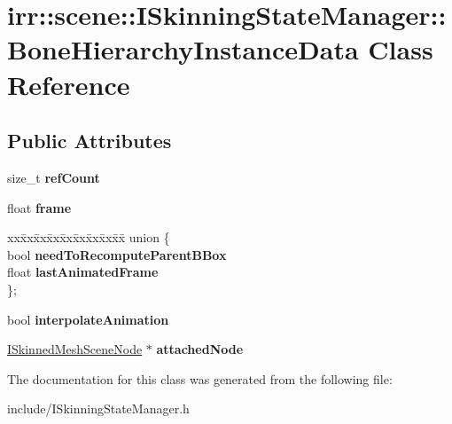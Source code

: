 \hypertarget{classirr_1_1scene_1_1ISkinningStateManager_1_1BoneHierarchyInstanceData}{}\section{irr\+:\+:scene\+:\+:I\+Skinning\+State\+Manager\+:\+:Bone\+Hierarchy\+Instance\+Data Class Reference}
\label{classirr_1_1scene_1_1ISkinningStateManager_1_1BoneHierarchyInstanceData}
\subsection*{Public Attributes}
\begin{DoxyCompactItemize}
\item 
size\+\_\+t {\bfseries ref\+Count}\hypertarget{classirr_1_1scene_1_1ISkinningStateManager_1_1BoneHierarchyInstanceData_a73724f7a387abec5025da026b398535b}{}\label{classirr_1_1scene_1_1ISkinningStateManager_1_1BoneHierarchyInstanceData_a73724f7a387abec5025da026b398535b}

\item 
float {\bfseries frame}\hypertarget{classirr_1_1scene_1_1ISkinningStateManager_1_1BoneHierarchyInstanceData_a13fb88dfbbde14b040ed1503d1e013a5}{}\label{classirr_1_1scene_1_1ISkinningStateManager_1_1BoneHierarchyInstanceData_a13fb88dfbbde14b040ed1503d1e013a5}

\item 
\begin{tabbing}
xx\=xx\=xx\=xx\=xx\=xx\=xx\=xx\=xx\=\kill
union \{\\
\>bool {\bfseries needToRecomputeParentBBox}\\
\>float {\bfseries lastAnimatedFrame}\\
\}; \hypertarget{classirr_1_1scene_1_1ISkinningStateManager_1_1BoneHierarchyInstanceData_a6d479d121c31b533319008d904d7aa2f}{}\label{classirr_1_1scene_1_1ISkinningStateManager_1_1BoneHierarchyInstanceData_a6d479d121c31b533319008d904d7aa2f}
\\

\end{tabbing}\item 
bool {\bfseries interpolate\+Animation}\hypertarget{classirr_1_1scene_1_1ISkinningStateManager_1_1BoneHierarchyInstanceData_a95665f28a263921d662d2b46b6854b0e}{}\label{classirr_1_1scene_1_1ISkinningStateManager_1_1BoneHierarchyInstanceData_a95665f28a263921d662d2b46b6854b0e}

\item 
\hyperlink{classirr_1_1scene_1_1ISkinnedMeshSceneNode}{I\+Skinned\+Mesh\+Scene\+Node} $\ast$ {\bfseries attached\+Node}\hypertarget{classirr_1_1scene_1_1ISkinningStateManager_1_1BoneHierarchyInstanceData_a13ca652d65f579f6af3ae6c4e5ab3363}{}\label{classirr_1_1scene_1_1ISkinningStateManager_1_1BoneHierarchyInstanceData_a13ca652d65f579f6af3ae6c4e5ab3363}

\end{DoxyCompactItemize}


The documentation for this class was generated from the following file\+:\begin{DoxyCompactItemize}
\item 
include/I\+Skinning\+State\+Manager.\+h\end{DoxyCompactItemize}
